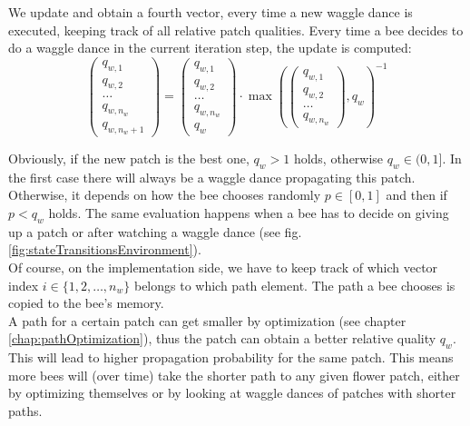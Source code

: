 			We update and obtain a fourth vector, every time a new waggle dance is executed, keeping track of all relative patch qualities. Every time a bee decides to do a waggle dance in the current iteration step, the update is computed:
			\begin{equation}\label{eq:evalPatchQualityNormalize}
				\begin{pmatrix}
					q_{w,1} \\ q_{w,2} \\ \dots \\ q_{w,n_w} \\ q_{w,n_w + 1}
				\end{pmatrix}
				=
				\begin{pmatrix}
					q_{w,1} \\ q_{w,2} \\ \dots \\ q_{w,n_w} \\ q_w
				\end{pmatrix}
				\cdot
				\max(
				\begin{pmatrix}
					q_{w,1} \\ q_{w,2} \\ \dots \\ q_{w,n_w}
				\end{pmatrix}, q_w)^{-1}
			\end{equation}
			
			Obviously, if the new patch is the best one, $q_w > 1$ holds, otherwise $q_w \in (0,1]$. In the first case there will always be a waggle dance propagating this patch. Otherwise, it depends on how the bee chooses randomly $p \in [0,1]$ and then if $p < q_w$ holds. The same evaluation happens when a bee has to decide on giving up a patch or after watching a waggle dance (see fig. \ref{fig:stateTransitionsEnvironment}). \\
			Of course, on the implementation side, we have to keep track of which vector index $i \in \{1,2, \ldots, n_w\}$ belongs to which path element. The path a bee chooses is copied to the bee's memory.\\

			A path for a certain patch can get smaller by optimization (see chapter \ref{chap:pathOptimization}), thus the patch can obtain a better relative quality $q_w$. This will lead to higher propagation probability for the same patch. This means more bees will (over time) take the shorter path to any given flower patch, either by optimizing themselves or by looking at waggle dances of patches with shorter paths.\\
	
